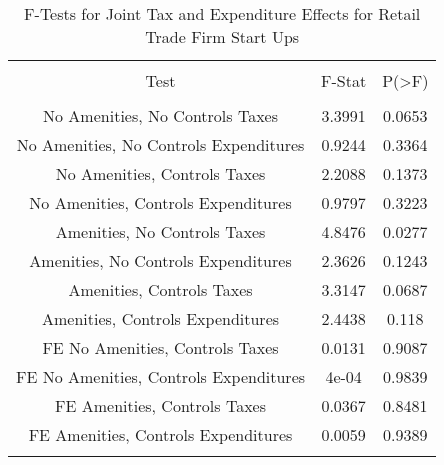 
\begin{table}[!htbp] \centering 
  \caption{F-Tests for Joint Tax and Expenditure Effects for Retail Trade Firm Start Ups} 
  \label{44-45Ftests} 
\begin{tabular}{@{\extracolsep{5pt}} ccc} 
\\[-1.8ex]\hline 
\hline \\[-1.8ex] 
Test & F-Stat & P(\textgreater F) \\ 
\hline \\[-1.8ex] 
No Amenities, No Controls Taxes & 3.3991 & 0.0653 \\ 
No Amenities, No Controls Expenditures & 0.9244 & 0.3364 \\ 
No Amenities, Controls Taxes & 2.2088 & 0.1373 \\ 
No Amenities, Controls Expenditures & 0.9797 & 0.3223 \\ 
Amenities, No Controls Taxes & 4.8476 & 0.0277 \\ 
Amenities, No Controls Expenditures & 2.3626 & 0.1243 \\ 
Amenities, Controls Taxes & 3.3147 & 0.0687 \\ 
Amenities, Controls Expenditures & 2.4438 & 0.118 \\ 
FE No Amenities, Controls Taxes & 0.0131 & 0.9087 \\ 
FE No Amenities, Controls Expenditures & 4e-04 & 0.9839 \\ 
FE Amenities, Controls Taxes & 0.0367 & 0.8481 \\ 
FE Amenities, Controls Expenditures & 0.0059 & 0.9389 \\ 
\hline \\[-1.8ex] 
\end{tabular} 
\end{table} 
